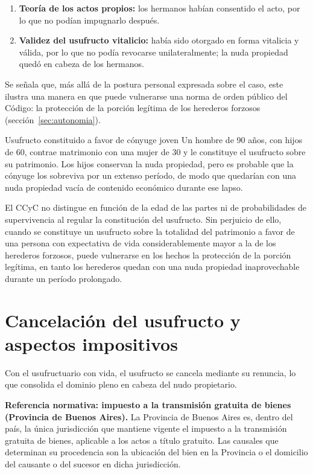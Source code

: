 \documentclass[12pt,oneside]{book}
\begin{document}
\begin{enumerate}
    \item \textbf{Teoría de los actos propios:} los hermanos habían consentido el acto, por lo que no podían impugnarlo después.
    \item \textbf{Validez del usufructo vitalicio:} había sido otorgado en forma vitalicia y válida, por lo que no podía revocarse unilateralmente; la nuda propiedad quedó en cabeza de los hermanos.
\end{enumerate}

Se señala que, más allá de la postura personal expresada sobre el caso, este ilustra una manera en que puede vulnerarse una norma de orden público del Código: la protección de la porción legítima de los herederos forzosos (sección~\ref{sec:autonomia}).

\begin{example}{Usufructo constituido a favor de cónyuge joven}
Un hombre de 90 años, con hijos de 60, contrae matrimonio con una mujer de 30 y le constituye el usufructo sobre su patrimonio. Los hijos conservan la nuda propiedad, pero es probable que la cónyuge los sobreviva por un extenso período, de modo que quedarían con una nuda propiedad vacía de contenido económico durante ese lapso.
\end{example}

\begin{important}
El CCyC no distingue en función de la edad de las partes ni de probabilidades de supervivencia al regular la constitución del usufructo. Sin perjuicio de ello, cuando se constituye un usufructo sobre la totalidad del patrimonio a favor de una persona con expectativa de vida considerablemente mayor a la de los herederos forzosos, puede vulnerarse en los hechos la protección de la porción legítima, en tanto los herederos quedan con una nuda propiedad inaprovechable durante un período prolongado.
\end{important}

\section{Cancelación del usufructo y aspectos impositivos}
\label{sec:fiscal}

Con el usufructuario con vida, el usufructo se cancela mediante su renuncia, lo que consolida el dominio pleno en cabeza del nudo propietario.

\begin{important}
\textbf{Referencia normativa: impuesto a la transmisión gratuita de bienes (Provincia de Buenos Aires).} La Provincia de Buenos Aires es, dentro del país, la única jurisdicción que mantiene vigente el impuesto a la transmisión gratuita de bienes, aplicable a los actos a título gratuito. Las causales que determinan su procedencia son la ubicación del bien en la Provincia o el domicilio del causante o del sucesor en dicha jurisdicción.
\end{important}
\end{document}
